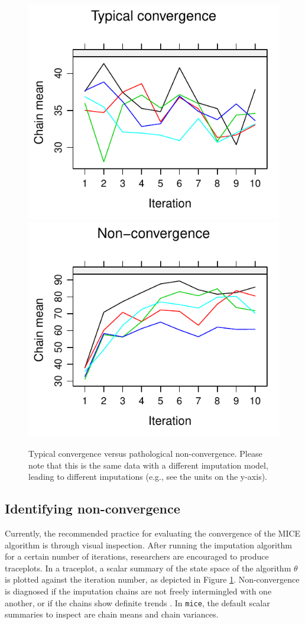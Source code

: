 \documentclass[Royal,times,sageh]{sagej}
\begin{document}
\begin{figure}

{\centering \includegraphics[width=.49\linewidth]{2.Manuscript_files/figure-latex/non-conv-1} \includegraphics[width=.49\linewidth]{2.Manuscript_files/figure-latex/non-conv-2} 

}

\caption{Typical convergence versus pathological non-convergence. Please note that this is the same data with a different imputation model, leading to different imputations (e.g., see the units on the y-axis).}\label{fig:non-conv}
\end{figure}

\hypertarget{identifying-non-convergence}{%
\subsection{Identifying non-convergence}\label{identifying-non-convergence}}

Currently, the recommended practice for evaluating the convergence of the MICE algorithm is through visual inspection. After running the imputation algorithm for a certain number of iterations, researchers are encouraged to produce traceplots. In a traceplot, a scalar summary of the state space of the algorithm \(\theta\) is plotted against the iteration number, as depicted in Figure \ref{fig:non-conv}. Non-convergence is diagnosed if the imputation chains are not freely intermingled with one another, or if the chains show definite trends \citep{buur18}. In \texttt{mice}, the default scalar summaries to inspect are chain means and chain variances.
\end{document}

